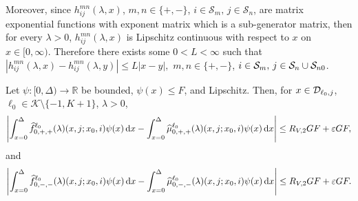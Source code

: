 Moreover, since \(h_{ij}^{mn}(\lambda,x)\), \(m,n\in \{+,-\}\), \(i\in\mathcal S_m,\,j\in\mathcal S_n\), are matrix exponential functions with exponent matrix which is a sub-generator matrix, then for every \(\lambda >0\), \(h_{ij}^{mn}(\lambda,x)\) is Lipschitz continuous with respect to \(x\) on \(x\in[0,\infty)\). Therefore there exists some \(0<L<\infty\) such that \(\left|h_{ij}^{mn}(\lambda,x)-h_{ij}^{mn}(\lambda,y)\right|\leq L|x-y|,\) \(m,n\in \{+,-\}\), \(i\in\mathcal S_m,\,j\in\mathcal S_n\cup\mathcal{S}_{n0}\).

\begin{lem}\label{lem: Dcoajc}
	Let \(\psi:[0,\Delta)\to \mathbb R\) be bounded, \(\psi(x)\leq F\), and Lipschitz. Then, for \(x\in\mathcal{D}_{\ell_0,j}\), \(\ell_0\in\mathcal K\setminus\{-1,K+1\}\), \(\lambda > 0\),
	\begin{align}
            	\left|\int_{x=0}^\Delta \widehat f^{\ell_0}_{0,+,+}(\lambda)(x,j; x_0,i)\psi(x)\, \mathrm{d} x - \int_{x=0}^\Delta\widehat \mu^{\ell_0}_{0,+,+}(\lambda)(x,j; x_0,i)\psi(x)\, \mathrm{d} x\right| \leq R_{V,2} GF + \varepsilon GF, \label{eqn: anue}
            \end{align}
            and 
            \begin{align}
            	\left|\int_{x=0}^\Delta \widehat f^{\ell_0}_{0,-,-}(\lambda)(x,j; x_0,i)\psi(x)\, \mathrm{d} x - \int_{x=0}^\Delta\widehat \mu^{\ell_0}_{0,-,-}(\lambda)(x,j; x_0,i)\psi(x)\, \mathrm{d} x\right| \leq R_{V,2} GF + \varepsilon GF. \label{eqn: anue2}
            \end{align} 
\end{lem}
